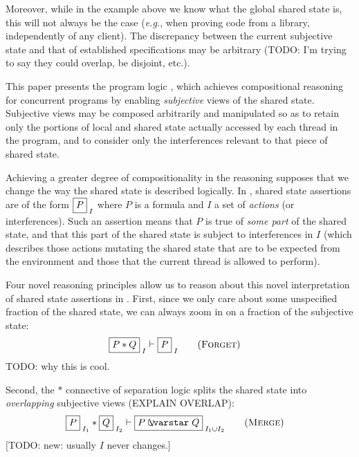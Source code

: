 Moreover, while in the example above we know what the global shared
state is, this will not always be the case (\textit{e.g.}, when
proving code from a library, independently of any client). The
discrepancy between the current subjective state and that of
established specifications may be arbitrary (TODO: I'm trying to say
they could overlap, be disjoint, etc.).

This paper presents the program logic \colosl, which achieves
compositional reasoning for concurrent programs by enabling
\emph{subjective} views of the shared state. Subjective views may be
composed arbitrarily and manipulated so as to retain only the portions
of local and shared state actually accessed by each thread in the
program, and to consider only the interferences relevant to that piece
of shared state.



Achieving a greater degree of compositionality in the reasoning
supposes that we change the way the shared state is described
logically.  In \colosl, shared state assertions are of the form
$\shared P I$ where $P$ is a formula and $I$ a set of \emph{actions}
(or interferences). Such an assertion means that $P$ is true of
\emph{some part} of the shared state, and that this part of the shared
state is subject to interferences in $I$ (which describes those
actions mutating the shared state that are to be expected from the
environment and those that the current thread is allowed to perform).

Four novel reasoning principles allow us to reason about this novel
interpretation of shared state assertions in \colosl. First, since we
only care about some unspecified fraction of the shared state, we can
always  zoom in on a fraction of the subjective state:
\begin{align*}
  \shared{P * Q}{I} &\vdash \shared{P}{I}  \tag{\textsc{Forget}}
\end{align*}
TODO: why this is cool.

Second, the $*$ connective of separation logic splits the shared state
into \emph{overlapping} subjective views (EXPLAIN OVERLAP):
\begin{align*}
  \shared{P}{I_1} * \shared{Q}{I_2} &\vdash \shared{P \sepish Q}{I_1 \cup I_2} \tag{\textsc{Merge}}
\end{align*}
[TODO: new: usually $I$ never changes.]

